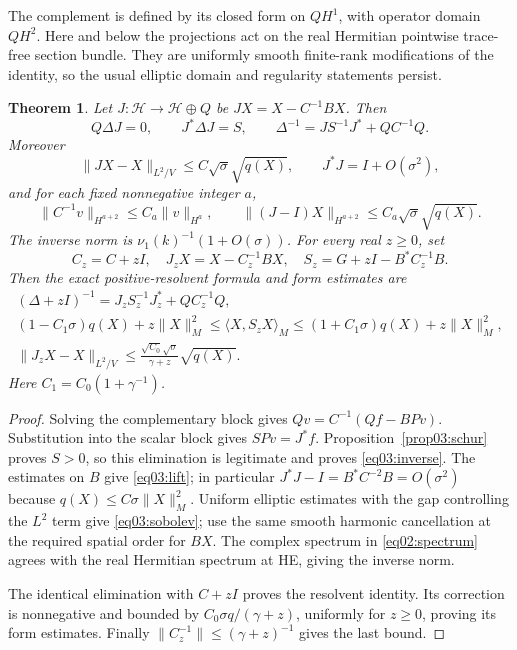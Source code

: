 \documentclass[11pt]{amsart}
\newtheorem{theorem}{Theorem}[section]
\theoremstyle{definition}
\theoremstyle{remark}
\newcommand{\HH}{\mathcal H}
\begin{document}
The complement is defined by its closed form on \(QH^1\), with
operator domain \(QH^2\). Here and below the projections act on
the real Hermitian pointwise trace-free section bundle. They are
uniformly smooth finite-rank modifications of the identity, so the
usual elliptic domain and regularity statements persist.

\begin{theorem}\label{thm03:inverse}
Let \(J:\HH\to\HH\oplus Q\) be \(JX=X-C^{-1}BX\). Then
\begin{equation}\label{eq03:inverse}
 Q\Delta J=0,\qquad J^*\Delta J=S,\qquad
 \Delta^{-1}=JS^{-1}J^*+QC^{-1}Q.
\end{equation}
Moreover
\begin{equation}\label{eq03:lift}
 \|JX-X\|_{L^2/V}\le C\sqrt\sigma\sqrt{q(X)},\qquad
 J^*J=I+O(\sigma^2),
\end{equation}
and for each fixed nonnegative integer \(a\),
\begin{equation}\label{eq03:sobolev}
 \|C^{-1}v\|_{H^{a+2}}\le C_a\|v\|_{H^a},\qquad
 \|(J-I)X\|_{H^{a+2}}\le C_a\sqrt\sigma\sqrt{q(X)}.
\end{equation}
The inverse norm is \(\nu_1(k)^{-1}(1+O(\sigma))\).
For every real \(z\ge0\), set
\[
 C_z=C+zI,\quad J_zX=X-C_z^{-1}BX,
 \quad S_z=G+zI-B^*C_z^{-1}B.
\]
Then the exact positive-resolvent formula and form estimates are
\begin{equation}\label{eq03:resolvent}
 \begin{gathered}
 (\Delta+zI)^{-1}=J_zS_z^{-1}J_z^*+QC_z^{-1}Q,\\
 (1-C_1\sigma)q(X)+z\|X\|_M^2
 \le\langle X,S_zX\rangle_M
 \le(1+C_1\sigma)q(X)+z\|X\|_M^2,\\
 \|J_zX-X\|_{L^2/V}
 \le\frac{\sqrt{C_0}\sqrt\sigma}{\gamma+z}\sqrt{q(X)}.
 \end{gathered}
\end{equation}
Here \(C_1=C_0(1+\gamma^{-1})\).
\end{theorem}

\begin{proof}
Solving the complementary block gives \(Qv=C^{-1}(Qf-BPv)\).
Substitution into the scalar block gives \(SPv=J^*f\).
Proposition~\ref{prop03:schur} proves \(S>0\), so this elimination
is legitimate and proves \eqref{eq03:inverse}. The estimates on \(B\)
give \eqref{eq03:lift}; in particular
\(J^*J-I=B^*C^{-2}B=O(\sigma^2)\) because
\(q(X)\le C\sigma\|X\|_M^2\). Uniform elliptic estimates with the
gap controlling the \(L^2\) term give \eqref{eq03:sobolev}; use
the same smooth harmonic cancellation at the required spatial order
for \(BX\). The complex spectrum in \eqref{eq02:spectrum} agrees
with the real Hermitian spectrum at HE, giving the inverse norm.

The identical elimination with \(C+zI\) proves the resolvent identity.
Its correction is nonnegative and bounded by
\(C_0\sigma q/(\gamma+z)\),
uniformly for \(z\ge0\), proving its form estimates. Finally
\(\|C_z^{-1}\|\le(\gamma+z)^{-1}\) gives the last bound.
\end{proof}
\end{document}
